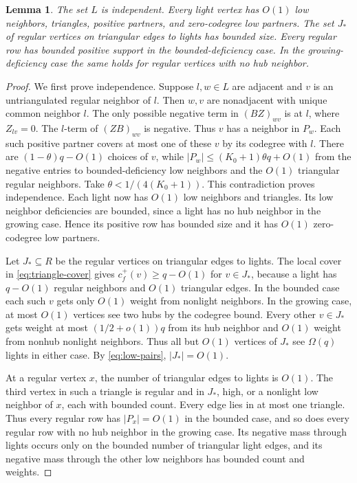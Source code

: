 \documentclass[11pt,reqno]{amsart}
\newtheorem{lemma}[theorem]{Lemma}
\theoremstyle{definition}
\theoremstyle{remark}
\numberwithin{equation}{section}
\begin{document}
\begin{lemma}\label{lem:light}
The set \(L\) is independent. Every light vertex has \(O(1)\) low
neighbors, triangles, positive partners, and zero-codegree low partners.
The set \(J_*\) of regular vertices on triangular edges to lights has
bounded size. Every regular row has bounded positive support in the
bounded-deficiency case. In the growing-deficiency case the same holds
for regular vertices with no hub neighbor.
\end{lemma}
\begin{proof}
We first prove independence. Suppose \(l,w\in L\) are adjacent and \(v\) is an untriangulated regular neighbor of \(l\). Then \(w,v\) are nonadjacent with unique common neighbor \(l\). The only possible negative term in \((BZ)_{wv}\) is at \(l\), where \(Z_{lv}=0\). The \(l\)-term of \((ZB)_{wv}\) is negative. Thus \(v\) has a neighbor in \(P_w\). Each such positive partner covers at most one of these \(v\) by its codegree with \(l\). There are \((1-\theta)q-O(1)\) choices of \(v\), while \(|P_w|\le(K_0+1)\theta q+O(1)\) from the negative entries to bounded-deficiency low neighbors and the \(O(1)\) triangular regular neighbors. Take \(\theta<1/(4(K_0+1))\). This contradiction proves independence. Each light now has \(O(1)\) low neighbors and triangles. Its low neighbor deficiencies are bounded, since a light has no hub neighbor in the growing case. Hence its positive row has bounded size and it has \(O(1)\) zero-codegree low partners.

Let \(J_*\subseteq R\) be the regular vertices on triangular edges to lights. The local cover in \eqref{eq:triangle-cover} gives \(c_f^+(v)\ge q-O(1)\) for \(v\in J_*\), because a light has \(q-O(1)\) regular neighbors and \(O(1)\) triangular edges. In the bounded case each such \(v\) gets only \(O(1)\) weight from nonlight neighbors. In the growing case, at most \(O(1)\) vertices see two hubs by the codegree bound. Every other \(v\in J_*\) gets weight at most \((1/2+o(1))q\) from its hub neighbor and \(O(1)\) weight from nonhub nonlight neighbors. Thus all but \(O(1)\) vertices of \(J_*\) see \(\Omega(q)\) lights in either case. By \eqref{eq:low-pairs}, \(|J_*|=O(1)\).

At a regular vertex \(x\), the number of triangular edges to lights is \(O(1)\). The third vertex in such a triangle is regular and in \(J_*\), high, or a nonlight low neighbor of \(x\), each with bounded count. Every edge lies in at most one triangle. Thus every regular row has \(|P_x|=O(1)\) in the bounded case, and so does every regular row with no hub neighbor in the growing case. Its negative mass through lights occurs only on the bounded number of triangular light edges, and its negative mass through the other low neighbors has bounded count and weights.

\end{proof}
\end{document}
